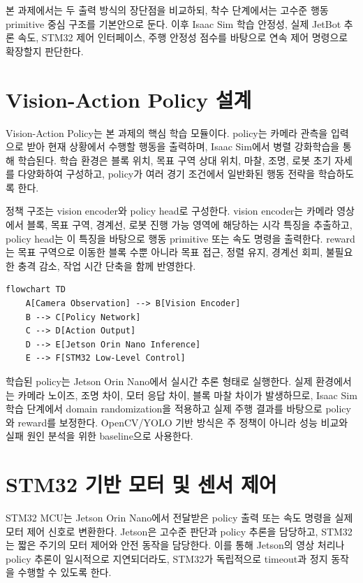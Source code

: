 \documentclass[titlepage]{pnureport}
\begin{document}
본 과제에서는 두 출력 방식의 장단점을 비교하되, 착수 단계에서는 고수준 행동 primitive 중심 구조를 기본안으로 둔다. 이후 Isaac Sim 학습 안정성, 실제 JetBot 추론 속도, STM32 제어 인터페이스, 주행 안정성 점수를 바탕으로 연속 제어 명령으로 확장할지 판단한다.

\section{Vision-Action Policy 설계}

Vision-Action Policy는 본 과제의 핵심 학습 모듈이다. policy는 카메라 관측을 입력으로 받아 현재 상황에서 수행할 행동을 출력하며, Isaac Sim에서 병렬 강화학습을 통해 학습된다. 학습 환경은 블록 위치, 목표 구역 상대 위치, 마찰, 조명, 로봇 초기 자세를 다양화하여 구성하고, policy가 여러 경기 조건에서 일반화된 행동 전략을 학습하도록 한다.

정책 구조는 vision encoder와 policy head로 구성한다. vision encoder는 카메라 영상에서 블록, 목표 구역, 경계선, 로봇 진행 가능 영역에 해당하는 시각 특징을 추출하고, policy head는 이 특징을 바탕으로 행동 primitive 또는 속도 명령을 출력한다. reward는 목표 구역으로 이동한 블록 수뿐 아니라 목표 접근, 정렬 유지, 경계선 회피, 불필요한 충격 감소, 작업 시간 단축을 함께 반영한다.

\begin{lstlisting}[language=mermaid,caption={Vision-Action Policy 구조 Mermaid 표현}]
flowchart TD
    A[Camera Observation] --> B[Vision Encoder]
    B --> C[Policy Network]
    C --> D[Action Output]
    D --> E[Jetson Orin Nano Inference]
    E --> F[STM32 Low-Level Control]
\end{lstlisting}

학습된 policy는 Jetson Orin Nano에서 실시간 추론 형태로 실행한다. 실제 환경에서는 카메라 노이즈, 조명 차이, 모터 응답 차이, 블록 마찰 차이가 발생하므로, Isaac Sim 학습 단계에서 domain randomization을 적용하고 실제 주행 결과를 바탕으로 policy와 reward를 보정한다. OpenCV/YOLO 기반 방식은 주 정책이 아니라 성능 비교와 실패 원인 분석을 위한 baseline으로 사용한다.

\section{STM32 기반 모터 및 센서 제어}

STM32 MCU는 Jetson Orin Nano에서 전달받은 policy 출력 또는 속도 명령을 실제 모터 제어 신호로 변환한다. Jetson은 고수준 판단과 policy 추론을 담당하고, STM32는 짧은 주기의 모터 제어와 안전 동작을 담당한다. 이를 통해 Jetson의 영상 처리나 policy 추론이 일시적으로 지연되더라도, STM32가 독립적으로 timeout과 정지 동작을 수행할 수 있도록 한다.
\end{document}
